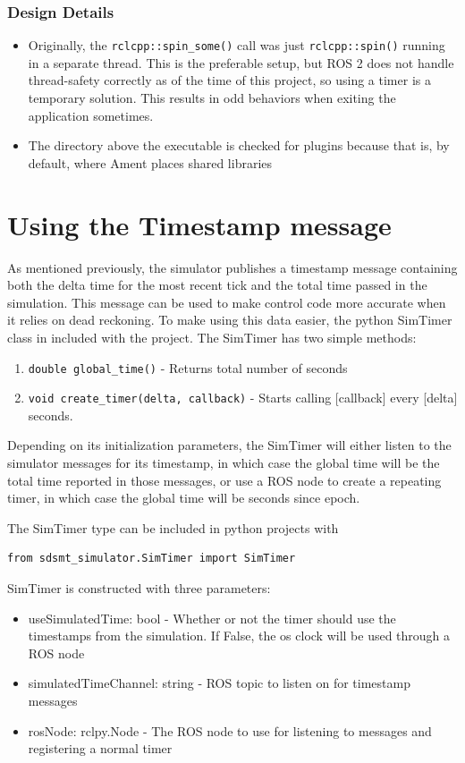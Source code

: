 \begin{itemize}
\subsubsection*{Design Details}
\begin{itemize}
	\item Originally, the \lstinline|rclcpp::spin_some()| call was just \lstinline|rclcpp::spin()| running in a separate thread. This is the preferable setup, but ROS 2 does not handle thread-safety correctly as of the time of this project, so using a timer is a temporary solution. This results in odd behaviors when exiting the application sometimes.
	\item The directory above the executable is checked for plugins because that is, by default, where Ament places shared libraries
\end{itemize}

\section{Using the Timestamp message}
As mentioned previously, the simulator publishes a timestamp message containing both the delta time for the most recent tick and the total time passed in the simulation. This message can be used to make control code more accurate when it relies on dead reckoning. To make using this data easier, the python SimTimer class in included with the project. The SimTimer has two simple methods:
\begin{enumerate}
	\item \lstinline|double global_time()| - Returns total number of seconds
	\item \lstinline|void create_timer(delta, callback)| - Starts calling [callback] every [delta] seconds.
\end{enumerate}

Depending on its initialization parameters, the SimTimer will either listen to the simulator messages for its timestamp, in which case the global time will be the total time reported in those messages, or use a ROS node to create a repeating timer, in which case the global time will be seconds since epoch.

The SimTimer type can be included in python projects with \begin{lstlisting}
from sdsmt_simulator.SimTimer import SimTimer
\end{lstlisting}

SimTimer is constructed with three parameters:
\begin{itemize}
	\item useSimulatedTime: bool - Whether or not the timer should use the timestamps from the simulation. If False, the os clock will be used through a ROS node
	\item simulatedTimeChannel: string - ROS topic to listen on for timestamp messages
	\item rosNode: rclpy.Node - The ROS node to use for listening to messages and registering a normal timer
\end{itemize}


\end{itemize}
